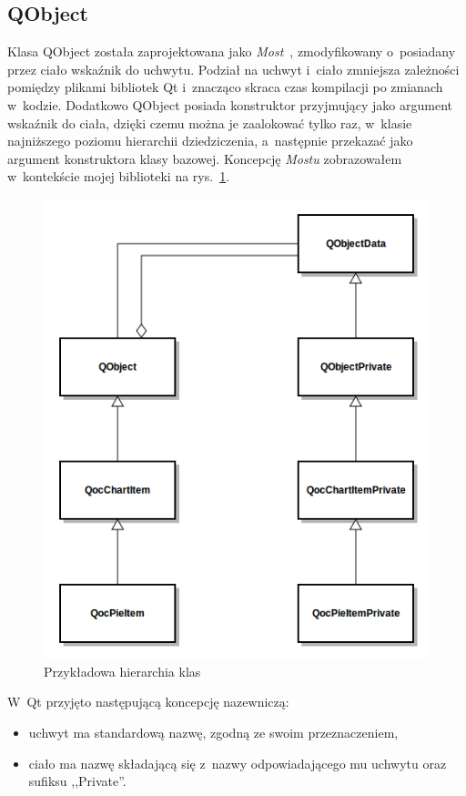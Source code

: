 \subsection{QObject}
Klasa QObject została zaprojektowana jako \textit{Most}~\cite[181-190]{Patterns}, zmodyfikowany o~posiadany przez ciało wskaźnik do uchwytu. Podział na uchwyt i~ciało zmniejsza zależności pomiędzy plikami bibliotek Qt i~znacząco skraca czas kompilacji po zmianach w~kodzie. Dodatkowo QObject posiada konstruktor przyjmujący jako argument wskaźnik do ciała, dzięki czemu można je zaalokować tylko raz, w~klasie najniższego poziomu hierarchii dziedziczenia, a~następnie przekazać jako argument konstruktora klasy bazowej. 
Koncepcję \textit{Mostu} zobrazowałem w~kontekście mojej biblioteki na rys.~\ref{rys:dpointer}.\newline

\begin{figure}
\centering
\caption{Przykładowa hierarchia klas}\label{rys:dpointer}
\includegraphics[scale=0.8]{img/dpointer.png}
\end{figure}

W~Qt przyjęto następującą koncepcję nazewniczą:
\begin{itemize}
\item{uchwyt ma standardową nazwę, zgodną ze swoim przeznaczeniem,}
\item{ciało ma nazwę składającą się z~nazwy odpowiadającego mu uchwytu oraz sufiksu ,,Private''.}
\end{itemize}


